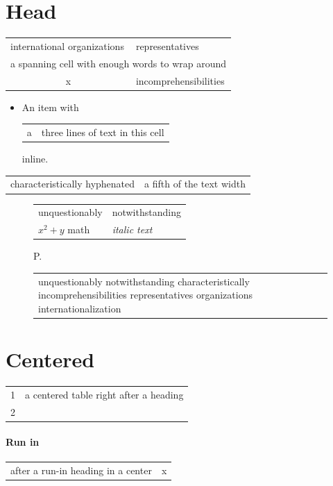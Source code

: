 \documentclass{article}
\begin{document}
\section{Head}
\begin{tabular}{p{1.5cm}p{2cm}}
international organizations & representatives \\
\multicolumn{2}{p{4cm}}{a spanning cell with enough words to wrap around} \\
\multicolumn{1}{c}{x} & incomprehensibilities
\end{tabular}

\begin{itemize}
\item An item with \begin{tabular}{lp{2cm}} a & three lines of text in this cell \end{tabular} inline.
\end{itemize}

\begin{center}
\begin{tabular}{p{1cm}p{}}
characteristically hyphenated & a fifth of the text width
\end{tabular}
\end{center}

\begin{figure}[h]
\centering
\begin{tabular}{p{1.2cm}|p{1.2cm}}
unquestionably & notwithstanding \\[-2pt]
$x^2+y$ math & \textit{italic text}
\end{tabular}
\caption{P.}
\end{figure}

\begin{figure}[h]
\centering
\begin{tabular}{p{1.6cm}}
unquestionably notwithstanding characteristically incomprehensibilities representatives organizations internationalization
\end{tabular}
\end{figure}
\section{Centered}

\begin{center}
\begin{tabular}{rp{2cm}}
1 & a centered table right after a heading \\
2 & \\
\end{tabular}
\end{center}

\paragraph{Run in}

\begin{center}
\begin{tabular}{|p{2cm}l@{}}
after a run-in heading in a center & x
\end{tabular}
\end{center}
\end{document}
